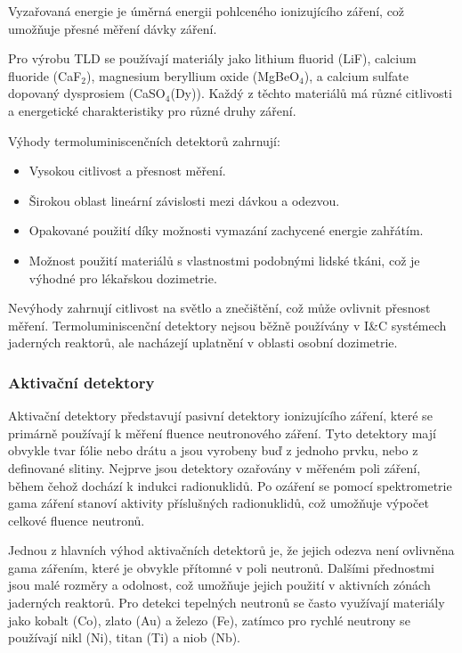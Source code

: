 Vyzařovaná energie je úměrná energii pohlceného ionizujícího záření, což umožňuje přesné měření dávky záření. 

Pro výrobu TLD se používají materiály jako lithium fluorid (LiF), calcium fluoride (CaF$_2$), magnesium beryllium oxide (MgBeO$_4$), a calcium sulfate dopovaný dysprosiem (CaSO$_4$(Dy)). Každý z těchto materiálů má různé citlivosti a energetické charakteristiky pro různé druhy záření.

Výhody termoluminiscenčních detektorů zahrnují:

\begin{itemize}
    \item Vysokou citlivost a přesnost měření.
    \item Širokou oblast lineární závislosti mezi dávkou a odezvou.
    \item Opakované použití díky možnosti vymazání zachycené energie zahřátím.
    \item Možnost použití materiálů s vlastnostmi podobnými lidské tkáni, což je výhodné pro lékařskou dozimetrie.
\end{itemize}

Nevýhody zahrnují citlivost na světlo a znečištění, což může ovlivnit přesnost měření. Termoluminiscenční detektory nejsou běžně používány v I\&C systémech jaderných reaktorů, ale nacházejí uplatnění v oblasti osobní dozimetrie.

\subsubsection{Aktivační detektory}

Aktivační detektory představují pasivní detektory ionizujícího záření, které se primárně používají k měření fluence neutronového záření. Tyto detektory mají obvykle tvar fólie nebo drátu a jsou vyrobeny buď z jednoho prvku, nebo z definované slitiny. Nejprve jsou detektory ozařovány v měřeném poli záření, během čehož dochází k indukci radionuklidů. Po ozáření se pomocí spektrometrie gama záření stanoví aktivity příslušných radionuklidů, což umožňuje výpočet celkové fluence neutronů.

Jednou z hlavních výhod aktivačních detektorů je, že jejich odezva není ovlivněna gama zářením, které je obvykle přítomné v poli neutronů. Dalšími přednostmi jsou malé rozměry a odolnost, což umožňuje jejich použití v aktivních zónách jaderných reaktorů. Pro detekci tepelných neutronů se často využívají materiály jako kobalt (Co), zlato (Au) a železo (Fe), zatímco pro rychlé neutrony se používají nikl (Ni), titan (Ti) a niob (Nb).

